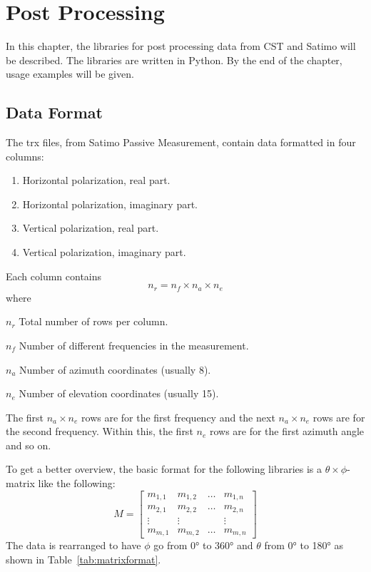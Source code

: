 \chapter{Post Processing}
\label{cha:postproc}

In this chapter, the libraries for post processing data from CST and Satimo will be described. The libraries are written in Python. By the end of the chapter, usage examples will be given.

\section{Data Format}
The trx files, from Satimo Passive Measurement, contain data formatted in four columns:
\begin{enumerate}
    \item Horizontal polarization, real part.
    \item Horizontal polarization, imaginary part.
    \item Vertical polarization, real part.
    \item Vertical polarization, imaginary part.
\end{enumerate}
Each column contains 
\begin{equation}
    n_r =  n_f \times n_a \times n_e
\end{equation}
where
\begin{where}
\item[$n_r$] Total number of rows per column.
\item[$n_f$] Number of different frequencies in the measurement.
\item[$n_a$] Number of azimuth coordinates (usually 8).
\item[$n_e$] Number of elevation coordinates (usually 15).
\end{where}
The first $n_a \times n_e$ rows are for the first frequency and the next $n_a \times n_e$ rows are for the second frequency. Within this, the first $n_e$ rows are for the first azimuth angle and so on.

To get a better overview, the basic format for the following libraries is a $\theta \times \phi$-matrix like the following:
\begin{equation}
    M = \begin{bmatrix}
        m_{1,1} & m_{1,2} & \dots & m_{1,n} \\
        m_{2,1} & m_{2,2} & \dots & m_{2,n} \\
        \vdots & \vdots & & \vdots \\
        m_{m,1} & m_{m,2} & \dots & m_{m,n}
    \end{bmatrix}
\end{equation}
The data is rearranged to have $\phi$ go from \ang{0} to \ang{360} and $\theta$ from \ang{0} to \ang{180} as shown in Table~\ref{tab:matrixformat}.

